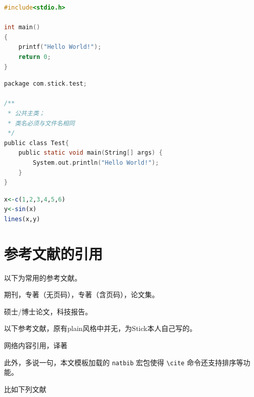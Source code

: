 \begin{lstlisting}[language=C]
#include<stdio.h>

int main()
{
	printf("Hello World!");
	return 0;
}
\end{lstlisting}

\begin{lstlisting}[language=C,caption={Java代码},label=Code:java]
package com.stick.test;

/**
 * 公共主类；
 * 类名必须与文件名相同
 */
public class Test{
	public static void main(String[] args) {
		System.out.println("Hello World!");
	}
}
\end{lstlisting}

\begin{lstlisting}[language=R,style = nonumbers]
x<-c(1,2,3,4,5,6)
y<-sin(x)
lines(x,y)
\end{lstlisting}
\section{参考文献的引用}
以下为常用的参考文献。

期刊\cite{Art,ArtE}，专著（无页码）\cite{Boo,BooE,Boo1}，专著（含页码）\cite{InBoo,InBoo1,InBooE}，论文集\cite{Incol,IncolE}。

硕士\cite{MT}/博士论文\cite{Phd}，科技报告\cite{TechR}。

以下参考文献，原有plain风格中并无，为Stick本人自己写的。

网络内容引用\cite{Net}，译著\cite{Trans}

此外，多说一句，本文模板加载的 \verb=natbib= 宏包使得 \verb=\cite= 命令还支持排序等功能。

比如下列文献\cite{ArtE,BooE,InBooE,Trans,Net}